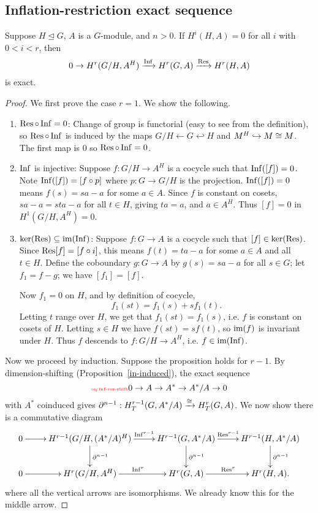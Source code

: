 \subsection{Inflation-restriction exact sequence}
\begin{pr}
Suppose $H\trianglelefteq G$, $A$ is a $G$-module, and $n>0$. If $H^i(H,A)=0$ for all $i$ with $0< i< r$, then
\[
0\to H^r(G/H,A^H)\xrightarrow{\operatorname{Inf}} H^r(G,A)\xrightarrow{\operatorname{Res}} H^r(H,A)
\]
is exact.
\end{pr}
\begin{proof}
We first prove the case $r=1$. We show the following.
\begin{enumerate}
\item $\operatorname{Res}\circ \operatorname{Inf} = 0$: 
Change of group is functorial (easy to see from the definition), so $\operatorname{Res}\circ \operatorname{Inf}$ is induced by the maps $G/H\leftarrow G\hookleftarrow H$ and $M^H\hookrightarrow M\cong M$. The first map is 0 so $\operatorname{Res}\circ\operatorname{Inf} =0$.
\item $\operatorname{Inf}$ is injective: Suppose $f:G/H\to A^H$ is a cocycle such that $\operatorname{Inf}([f])=0$. Note $\operatorname{Inf}([f])=[f\circ p]$ where $p:G\to G/H$ is the projection. $\operatorname{Inf}([f])=0$ means $f(s)=sa-a$ for some $a\in A$. Since $f$ is constant on cosets, $sa-a=sta-a$ for all $t\in H$, giving $ta=a$, and $a\in A^H$. Thus $[f]=0$ in $H^1(G/H,A^H)=0$.
\item $\ker(\operatorname{Res})\subseteq \text{im}(\operatorname{Inf})$: Suppose $f:G\to A$ is a cocycle such that $[f]\in \ker(\operatorname{Res})$. Since $\operatorname{Res}[f]=[f\circ i]$, this means $f(t)=ta-a$ for some $a\in A$ and all $t\in H$. Define the coboundary $g:G\to A$ by $g(s)=sa-a$ for all $s\in G$; let $f_1=f-g$; we have $[f_1]=[f]$.

Now $f_1=0$ on $H$, and by definition of cocycle,
\[
f_1(st)=f_1(s)+sf_1(t).
\]
Letting $t$ range over $H$, we get that $f_1(st)=f_1(s)$, i.e. $f$ is constant on cosets of $H$. Letting $s\in H$ we have $f(st)=sf(t)$, so $\text{im}(f)$ is invariant under $H$. Thus $f$ descends to $f:G/H\to A^H$, i.e. $f\in \text{im}(\operatorname{Inf})$.
\end{enumerate}
Now we proceed by induction. Suppose the proposition holds for $r-1$. By dimension-shifting (Proposition~\ref{in-induced}), the exact sequence 
\begin{equation}\llabel{eq:inf-res-shift}
0\to A\to A^*\to A^*/A\to 0
\end{equation}
with $A^*$ coinduced gives $\partial^{n-1}:H_T^{r-1}(G,A^*/A)\xrightarrow{\cong}H_T^r(G,A) $.  We now show there is a commutative diagram
\[
\xymatrix{
0 \ar[r] & H^{r-1}(G/H,(A^*/A)^H) \ar[r]^-{\Inf^{r-1}}\ar[d]^{\partial^{n-1}} & H^{r-1}(G,A^*/A)\ar[r]^{\Res^{r-1}}\ar[d]^{\partial^{n-1}} & H^{r-1}(H,A^*/A)\ar[d]^{\partial^{n-1}}\\
0\ar[r] & H^{r}(G/H,A^H) \ar[r]^{\Inf^{r}} & H^r(G,A) \ar[r]^{\Res^r} & H^r(H,A).
}
\]
where all the vertical arrows are isomorphisms. We already know this for the middle arrow.


\end{proof}
